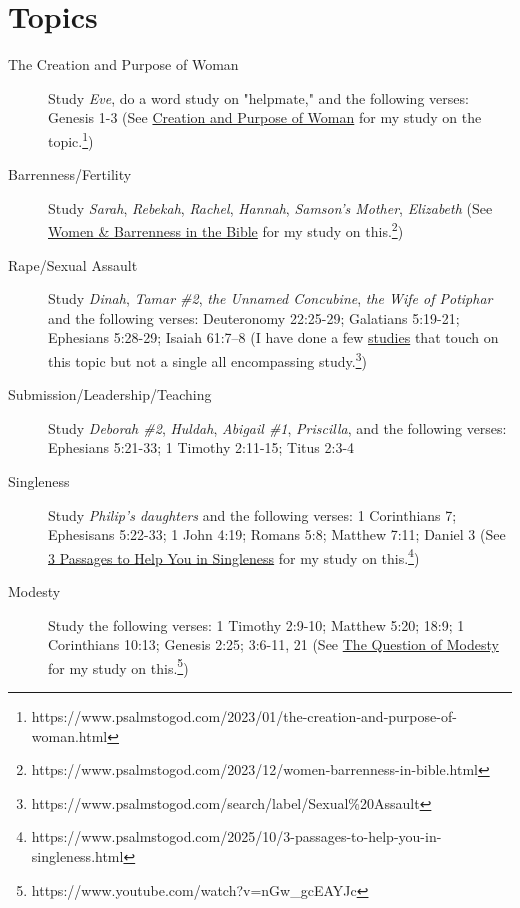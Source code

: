 \documentclass[12pt,letter,twoside,openany]{extbook}
\begin{document}
\chapter *{Topics}
\vspace{-.75in}
\begin{description}
	\item [The Creation and Purpose of Woman] Study \textit{Eve}, do a word study on "helpmate," and the following verses: Genesis 1-3 (See \href{https://www.psalmstogod.com/2023/01/the-creation-and-purpose-of-woman.html}{Creation and Purpose of Woman} for my study on the topic.\footnote{https://www.psalmstogod.com/2023/01/the-creation-and-purpose-of-woman.html})
	\item [Barrenness/Fertility] Study \textit{Sarah}, \textit{Rebekah}, \textit{Rachel}, \textit{Hannah}, \textit{Samson's Mother}, \textit{Elizabeth} (See \href{https://www.psalmstogod.com/2023/12/women-barrenness-in-bible.html}{Women \& Barrenness in the Bible} for my study on this.\footnote{https://www.psalmstogod.com/2023/12/women-barrenness-in-bible.html})
	\item [Rape/Sexual Assault] Study \textit{Dinah}, \textit{Tamar \#2}, \textit{the Unnamed Concubine}, \textit{the Wife of Potiphar} and the following verses: Deuteronomy 22:25-29; Galatians 5:19-21; Ephesians 5:28-29; Isaiah 61:7–8 (I have done a few \href{https://www.psalmstogod.com/search/label/Sexual%20Assault}{studies} that touch on this topic but not a single all encompassing study.\footnote{https://www.psalmstogod.com/search/label/Sexual\%20Assault})
	\item [Submission/Leadership/Teaching] Study \textit{Deborah \#2}, \textit{Huldah}, \textit{Abigail \#1}, \textit{Priscilla}, and the following verses: Ephesians 5:21-33; 1 Timothy 2:11-15; Titus 2:3-4
	\item [Singleness] Study \textit{Philip's daughters} and the following verses: 1 Corinthians 7; Ephesisans 5:22-33; 1 John 4:19; Romans 5:8; Matthew 7:11; Daniel 3 (See \href{https://www.psalmstogod.com/2025/10/3-passages-to-help-you-in-singleness.html}{3 Passages to Help You in Singleness} for my study on this.\footnote{https://www.psalmstogod.com/2025/10/3-passages-to-help-you-in-singleness.html})
	\item [Modesty] Study the following verses: 1 Timothy 2:9-10; Matthew 5:20; 18:9; 1 Corinthians 10:13; Genesis 2:25; 3:6-11, 21 (See \href{https://www.youtube.com/watch?v=nGw_gcEAYJc}{The Question of Modesty} for my study on this.\footnote{https://www.youtube.com/watch?v=nGw\_gcEAYJc})
\end{description}
\end{document}
